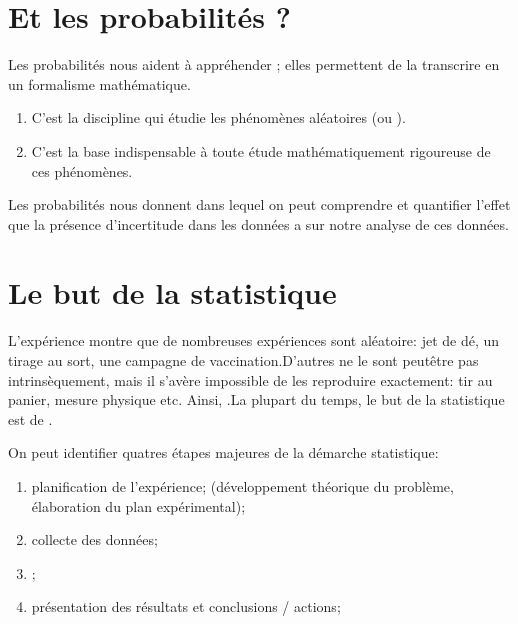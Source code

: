 \documentclass[letterpaper,10pt,english]{jupyterBook}
\begin{document}
\section{Et les probabilités ?}
\label{\detokenize{Introduction:et-les-probabilites}}
\sphinxAtStartPar
Les probabilités nous aident à appréhender ; elles permettent de la transcrire en un formalisme mathématique.
\begin{enumerate}
%
\item {} 
\sphinxAtStartPar
C’est la discipline qui étudie les phénomènes aléatoires (ou ).

\item {} 
\sphinxAtStartPar
C’est la base indispensable à toute étude mathématiquement rigoureuse de ces phénomènes.

\end{enumerate}

\sphinxAtStartPar
Les probabilités nous donnent  dans lequel on peut comprendre et quantifier l’effet que la présence d’incertitude dans les données a sur notre analyse de ces données.


\section{Le but de la statistique}
\label{\detokenize{Introduction:le-but-de-la-statistique}}
\sphinxAtStartPar
L’expérience montre que de nombreuses expériences sont  aléatoire: jet de dé, un tirage au sort, une campagne de vaccination.D’autres ne le sont peut\sphinxhyphen{}être pas intrinsèquement, mais il s’avère impossible de les reproduire exactement: tir au panier, mesure physique etc. Ainsi, .La plupart du temps, le but de la statistique est de .

\sphinxAtStartPar
On peut identifier quatres étapes majeures de la démarche statistique:
\begin{enumerate}
%
\item {} 
\sphinxAtStartPar
planification de l’expérience; (développement théorique du problème, élaboration du plan expérimental);

\item {} 
\sphinxAtStartPar
collecte des données;

\item {} 
\sphinxAtStartPar
{};

\item {} 
\sphinxAtStartPar
présentation des résultats et conclusions / actions;

\end{enumerate}
\end{document}
